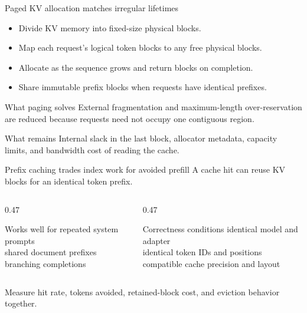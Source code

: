 \documentclass[handout]{beamer}
\begin{document}
\begin{frame}{Paged KV allocation matches irregular lifetimes}
  \begin{itemize}
    \setlength{\itemsep}{7pt}
    \item Divide KV memory into fixed-size physical blocks.
    \item Map each request's logical token blocks to any free physical blocks.
    \item Allocate as the sequence grows and return blocks on completion.
    \item Share immutable prefix blocks when requests have identical prefixes.
  \end{itemize}
  \begin{block}{What paging solves}
    External fragmentation and maximum-length over-reservation are reduced because requests need not occupy one contiguous region.
  \end{block}
  \begin{alertblock}{What remains}
    Internal slack in the last block, allocator metadata, capacity limits, and bandwidth cost of reading the cache.
  \end{alertblock}
\end{frame}

\begin{frame}{Prefix caching trades index work for avoided prefill}
  A cache hit can reuse KV blocks for an identical token prefix.
  \begin{columns}[t]
    \begin{column}{0.47\linewidth}
      \begin{block}{Works well for}
        repeated system prompts\\shared document prefixes\\branching completions
      \end{block}
    \end{column}
    \begin{column}{0.47\linewidth}
      \begin{alertblock}{Correctness conditions}
        identical model and adapter\\identical token IDs and positions\\compatible cache precision and layout
      \end{alertblock}
    \end{column}
  \end{columns}
  Measure hit rate, tokens avoided, retained-block cost, and eviction behavior together.
\end{frame}
\end{document}
